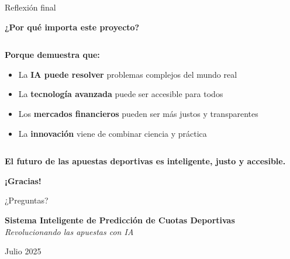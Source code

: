 \documentclass[aspectratio=169]{beamer}
\begin{document}
\begin{frame}{Reflexión final}
\begin{center}
\Large
\textcolor{azulprincipai}{\textbf{¿Por qué importa este proyecto?}}
\end{center}

\vspace{0.8cm}
\begin{columns}
\begin{column}{0.6\textwidth}
\large
\textbf{Porque demuestra que:}
\begin{itemize}
\item La \textcolor{verdepositivo}{\textbf{IA puede resolver}} problemas complejos del mundo real
\item La \textcolor{azulprincipai}{\textbf{tecnología avanzada}} puede ser accesible para todos
\item Los \textcolor{rojocomplementario}{\textbf{mercados financieros}} pueden ser más justos y transparentes
\item La \textcolor{verdepositivo}{\textbf{innovación}} viene de combinar ciencia y práctica
\end{itemize}
\end{column}
\begin{column}{0.4\textwidth}
\end{column}
\end{columns}

\vspace{0.8cm}
\begin{center}
\textbf{El futuro de las apuestas deportivas es \textcolor{azulprincipai}{inteligente}, \textcolor{verdepositivo}{justo} y \textcolor{rojocomplementario}{accesible}.}
\end{center}
\end{frame}

\begin{frame}
\begin{center}
\Huge \textcolor{azulprincipai}{\textbf{¡Gracias!}}

\vspace{1cm}
\Large ¿Preguntas?

\vspace{1cm}
\large 
\textbf{Sistema Inteligente de Predicción de Cuotas Deportivas}\\
\textit{Revolucionando las apuestas con IA}

\vspace{0.5cm}
\normalsize
Julio 2025
\end{center}
\end{frame}
\end{document}
